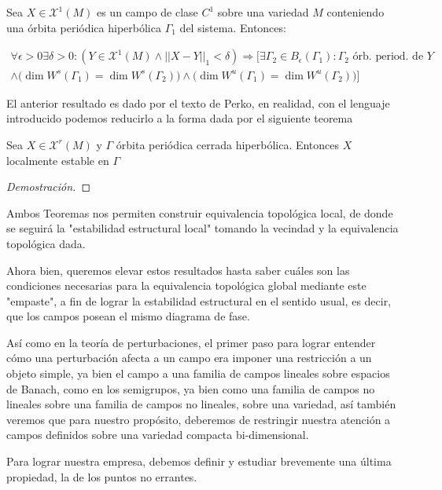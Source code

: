\begin{thm}
	Sea $X\in \mathcal{X}^1(M)$ es un campo de clase $C^1$ sobre una variedad $M$ conteniendo una órbita periódica hiperbólica $\Gamma_1$ del sistema. Entonces:
	
	\begin{align*}
		\forall \epsilon>0\exists\delta >0:(Y\in \mathcal{X}^1(M) \land ||X-Y||_1 < \delta) \Rightarrow [\exists \Gamma_2 \in B_\epsilon(\Gamma_1):\Gamma_2 \text{ órb. period. de }   Y \\
		\land \big(\dim W^s(\Gamma_1)=\dim W^s(\Gamma_2)\big)\land \big(\dim W^u(\Gamma_1)=\dim W^u(\Gamma_2)\big)]
	\end{align*}
\end{thm}

\begin{rmrk}
	El anterior resultado es dado por el texto de Perko, en realidad, con el lenguaje introducido podemos reducirlo a la forma dada por el siguiente teorema 
\end{rmrk}

\begin{thm}
	Sea $X \in \mathcal{X}^r(M)$ y $\Gamma$ órbita periódica cerrada hiperbólica. Entonces $X$ localmente estable en $\Gamma$
\end{thm}

\begin{proof}[Demostración]
	
\end{proof}


\begin{rmrk}
	Ambos Teoremas nos permiten construir equivalencia topológica local, de donde se seguirá la "estabilidad estructural local" tomando la vecindad y la equivalencia topológica dada. 
	
	Ahora bien, queremos elevar estos resultados hasta saber cuáles son las condiciones necesarias para la equivalencia topológica global mediante este "empaste", a fin de lograr la estabilidad estructural en el sentido usual, es decir, que los campos posean el mismo diagrama de fase.
	
	Así como en la teoría de perturbaciones, el primer paso para lograr entender cómo una perturbación afecta a un campo era imponer una restricción a un objeto simple, ya bien el campo a una familia de campos lineales sobre espacios de Banach, como en los semigrupos, ya bien como una familia de campos no lineales sobre una familia de campos no lineales, sobre una variedad, así también veremos que para nuestro propósito, deberemos de restringir nuestra atención a campos definidos sobre una  variedad compacta bi-dimensional. 
	
	Para lograr nuestra empresa, debemos definir y estudiar brevemente una última propiedad, la de los puntos no errantes.
\end{rmrk}

